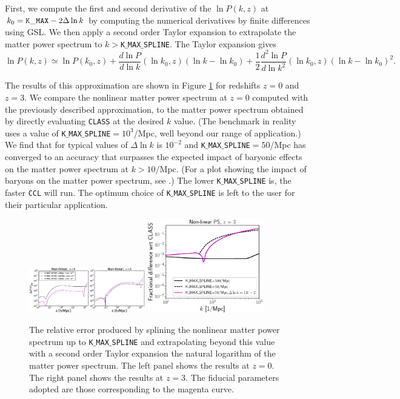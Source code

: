 \documentclass[\docopts]{\docclass}
\begin{document}
First, we compute the first and second derivative of the $\ln P(k,z)$ at $k_0={\rm \tt K\_MAX}-2\Delta\ln k$ by computing the numerical derivatives by finite differences using GSL. We then apply a second order Taylor expansion to extrapolate the matter power spectrum to $k>${\tt K$\_$MAX$\_$SPLINE}. The Taylor expansion gives
%
\begin{equation}
  \ln P(k,z) \simeq \ln P(k_0,z) + \frac{d\ln P}{d\ln k}(\ln k_0,z) (\ln k-\ln k_0)  + \frac{1}{2}  \frac{d^2\ln P}{d\ln k^2}(\ln k_0,z) (\ln k-\ln k_0)^2.
  \label{eq:NLPSTaylor}
\end{equation}

The results of this approximation are shown in Figure \ref{fig:NLextrapol} for redshifts $z=0$ and $z=3$. We compare the nonlinear matter power spectrum at $z=0$ computed with the previously described approximation, to the matter power spectrum obtained by directly evaluating {\tt CLASS} at the desired $k$ value. (The benchmark in reality uses a value of {\tt K$\_$MAX$\_$SPLINE}$=10^3$/Mpc, well beyond our range of application.) We find that for typical values of  $\Delta \ln k$ is $10^{-2}$ and {\tt K$\_$MAX$\_$SPLINE}$=50$/Mpc has converged to an accuracy that surpasses the expected impact of baryonic effects on the matter power spectrum at $k>10/$Mpc. (For a plot showing the impact of baryons on the matter power spectrum, see \citealt{Schneider15}.) The lower {\tt K$\_$MAX$\_$SPLINE} is, the faster {\tt CCL} will run. The optimum choice of {\tt K$\_$MAX$\_$SPLINE} is left to the user for their particular application. 

\begin{figure}
\centering
\includegraphics[width=0.45\textwidth]{PS_converge_nonlin.eps}
\includegraphics[width=0.45\textwidth]{PS_converge_nonlin_z3.eps}
\caption{The relative error produced by splining the nonlinear matter power spectrum up to {\tt K$\_$MAX$\_$SPLINE} and extrapolating beyond this value with a second order Taylor expansion the natural logarithm of the matter power spectrum. The left panel shows the results at $z=0$. The right panel shows the results at $z=3$. The fiducial parameters adopted are those corresponding to the magenta curve.}
\label{fig:NLextrapol}
\end{figure}
\end{document}
